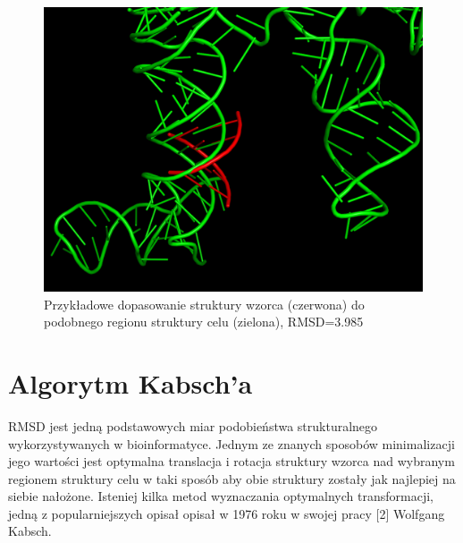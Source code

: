 \documentclass[licencjacka]{pracamgr}
\begin{document}
\begin{figure}[H]
\centering
\includegraphics[scale=0.25]{rmsd3}
\caption{Przykładowe dopasowanie struktury wzorca (czerwona) do podobnego regionu struktury celu (zielona), RMSD=3.985}
\end{figure}

%

\section{Algorytm Kabsch'a}
RMSD jest jedną podstawowych miar podobieństwa strukturalnego wykorzystywanych w bioinformatyce. Jednym ze znanych sposobów minimalizacji jego wartości jest optymalna translacja i rotacja struktury wzorca nad wybranym regionem struktury celu w taki sposób aby obie struktury zostały jak najlepiej na siebie nałożone. Isteniej kilka metod wyznaczania optymalnych transformacji, jedną z popularniejszych opisał opisał w 1976 roku w swojej pracy [2] Wolfgang Kabsch.
\end{document}
